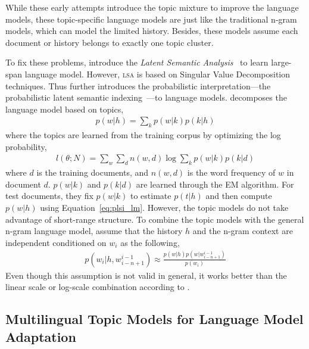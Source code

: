 While these early attempts introduce the topic mixture to improve the language models, these topic-specific language models are just like the traditional n-gram models, which can model the limited history. Besides, these models assume each document or history belongs to exactly one topic cluster. 

To fix these problems, \citet{Bellegarda-1997,Coccaro-1998} introduce the \emph{Latent Semantic Analysis}~\citep[\textsc{lsa}]{deerwester-90} to learn large-span language model. However, \textsc{lsa} is based on Singular Value Decomposition techniques. Thus \citet{Gildea-1999} further introduces the probabilistic interpretation---the probabilistic latent semantic indexing~\citep[\textsc{plsi}]{hoffman-99}---to language models. \citet{Gildea-1999} decomposes the language model based on topics,
\begin{align}
\label{eq:plsi_lm}
p(w|h) = \sum_k p(w|k) p(k|h)
\end{align}
where the topics are learned from the training corpus by optimizing the log probability,
\begin{align}
l(\theta; N) = \sum_w \sum_d n(w,d) \log \sum_k p(w|k) p(k|d)
\end{align}
where $d$ is the training documents, and $n(w,d)$ is the word frequency of $w$ in document $d$. $p(w|k)$ and $p(k|d)$ are learned through the EM algorithm. For test documents, they fix $p(w|k)$ to estimate $p(t|h)$ and then compute $p(w|h)$ using Equation~\ref{eq:plsi_lm}. However, the topic models do not take advantage of short-range structure. To combine the topic models with the general n-gram language model, \citet{Gildea-1999} assume that the history $h$ and the n-gram context are independent conditioned on $w_i$ as the following,
\begin{align}
p(w_i|h,w_{i-n+1}^{i-1}) \approx \frac{p(w|h)p(w|w_{i-n+1}^{i-1})}{p(w_i)}
\end{align}
Even though this assumption is not valid in general, it works better than the linear scale or log-scale combination according to \citet{Gildea-1999}.

\subsection{Multilingual Topic Models for Language Model Adaptation}

